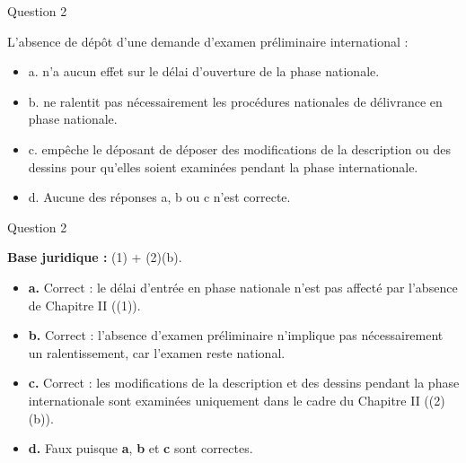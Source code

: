 \begin{frame}{Question 2}

\begin{block}{}
L’absence de dépôt d’une demande d’examen préliminaire international :

\begin{itemize}
  \item[$\bullet$] a. n’a aucun effet sur le délai d’ouverture de la phase nationale. 
  \item[$\bullet$] b. ne ralentit pas nécessairement les procédures nationales de délivrance en phase 
  nationale. 
  \item[$\bullet$] c. empêche le déposant de déposer des modifications de la description ou des dessins 
  pour qu’elles soient examinées pendant la phase internationale. 
  \item[$\circ$] d. Aucune des réponses a, b ou c n’est correcte. 
\end{itemize}

\end{block}

\end{frame}

\begin{frame}{Question 2}

\textbf{Base juridique :} (1) + (2)(b).  

\begin{itemize}
  \item[$\bullet$] \textbf{a.} \; Correct : le délai d’entrée en phase nationale
  n’est pas affecté par l’absence de Chapitre II ((1)).

  \item[$\bullet$] \textbf{b.} \; Correct : l’absence d’examen préliminaire n’implique pas nécessairement
  un ralentissement, car l’examen reste national.

  \item[$\bullet$] \textbf{c.} \; Correct : les modifications de la description et des dessins pendant la phase
  internationale sont examinées uniquement dans le cadre du Chapitre II
  ((2)(b)).

  \item[$\circ$] \textbf{d.} \; Faux puisque \textbf{a}, \textbf{b} et \textbf{c} sont correctes.
\end{itemize}

\end{frame}
